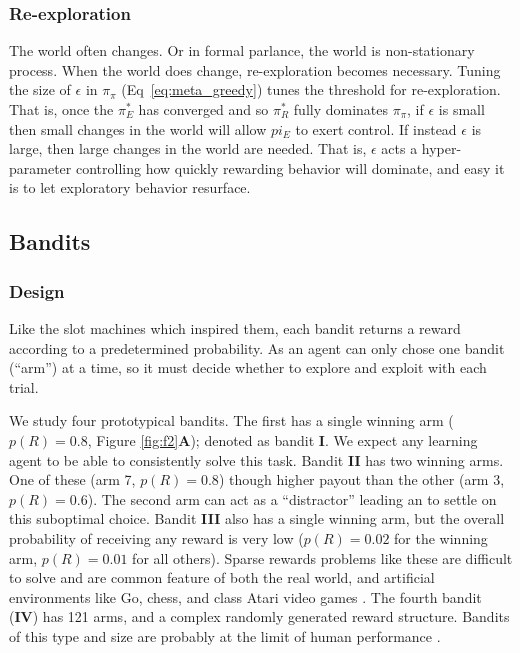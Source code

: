\subsubsection*{Re-exploration}
The world often changes. Or in formal parlance, the world is non-stationary process. When the world does change, re-exploration becomes necessary. Tuning the size of $\epsilon$ in $\pi_{\pi}$ (Eq~\ref{eq:meta_greedy}) tunes the threshold for re-exploration. That is, once the $\pi^*_E$ has converged and so $\pi^*_R$ fully dominates $\pi_{\pi}$, if $\epsilon$ is small then small changes in the world will allow $pi_E$ to exert control. If instead $\epsilon$ is large, then large changes in the world are needed. That is, $\epsilon$ acts a hyper-parameter controlling how quickly rewarding behavior will dominate, and easy it is to let exploratory behavior resurface.


\subsection*{Bandits}
\subsubsection*{Design} Like the slot machines which inspired them, each bandit returns a reward according to a predetermined probability. As an agent can only chose one bandit (``arm'') at a time, so it must decide whether to explore and exploit with each trial.

We study four prototypical bandits. The first has a single winning arm ($p(R) = 0.8$, Figure \ref{fig:f2}\textbf{A}); denoted as bandit \textbf{I}. We expect any learning agent to be able to consistently solve this task. Bandit \textbf{II} has two winning arms. One of these (arm 7, $p(R) = 0.8$) though higher payout than the other (arm 3, $p(R) = 0.6$). The second arm can act as a ``distractor'' leading an to settle on this suboptimal choice. Bandit \textbf{III} also has a single winning arm, but the overall probability of receiving any reward is very low ($p(R) = 0.02$ for the winning arm, $p(R) = 0.01$ for all others). Sparse rewards problems like these are difficult to solve and are common feature of both the real world, and artificial environments like Go, chess, and class Atari video games \cite{Mniha,Silver2016b,Silver2018}. The fourth bandit (\textbf{IV}) has 121 arms, and a complex randomly generated reward structure. Bandits of this type and size are probably at the limit of human performance \cite{Wu2018}. 

